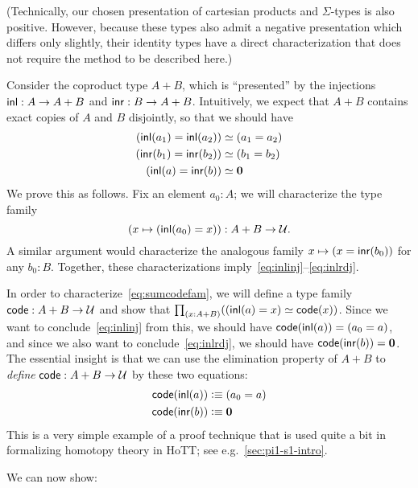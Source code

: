 (Technically, our chosen presentation of cartesian products and $\Sigma$-types is also positive.
However, because these types also admit a negative presentation which differs only slightly, their identity types have a direct characterization that does not require the method to be described here.)

Consider the coproduct type $A+B$, which is ``presented'' by the injections ${\mathsf{inl}}:A\to A+B$ and ${\mathsf{inr}}:B\to A+B$.
Intuitively, we expect that $A+B$ contains exact copies of $A$ and $B$ disjointly, so that we should have
\begin{align}
  {(\inl(a_1)=\inl(a_2))}&\simeq {(a_1=a_2)} \label{eq:inlinj}\\
  {(\inr(b_1)=\inr(b_2))}&\simeq {(b_1=b_2)}\\
  {(\inl(a)= \inr(b))} &\simeq {\emptyt} \label{eq:inlrdj}
\end{align}
We prove this as follows.
Fix an element $a_0:A$; we will characterize the type family
\begin{equation}
  (x\mapsto (\inl(a_0)=x)) : A+B \to \type.\label{eq:sumcodefam}
\end{equation}
A similar argument would characterize the analogous family $x\mapsto (x = {\mathsf{inr}}(b_0))$ for any $b_0:B$.
Together, these characterizations imply~\eqref{eq:inlinj}--\eqref{eq:inlrdj}.

In order to characterize~\eqref{eq:sumcodefam}, we will define a type family $\mathsf{code}:A+B\to\mathcal{U}$ and show that $\prd{x:A+B} (\eqv{(\inl(a)=x)}{\code(x)})$.
Since we want to conclude~\eqref{eq:inlinj} from this, we should have $\mathsf{code}({\mathsf{inl}}(a)) = (a_0=a)$, and since we also want to conclude~\eqref{eq:inlrdj}, we should have $\mathsf{code} ({\mathsf{inr}}(b)) = \mathbf{0}$.
The essential insight is that we can use the elimination property of $A+B$ to \emph{define} $\mathsf{code}:A+B\to\mathcal{U}$ by these two equations:
\begin{align*}
  \mathsf{code}({\mathsf{inl}}(a)) &\vcentcolon\equiv (a_0=a)\\
  \mathsf{code}({\mathsf{inr}}(b)) &\vcentcolon\equiv \mathbf{0}
\end{align*}
This is a very simple example of a proof technique that is used quite a
bit in formalizing homotopy theory in HoTT; see
e.g.\ \autoref{sec:pi1-s1-intro}.  

We can now show:

